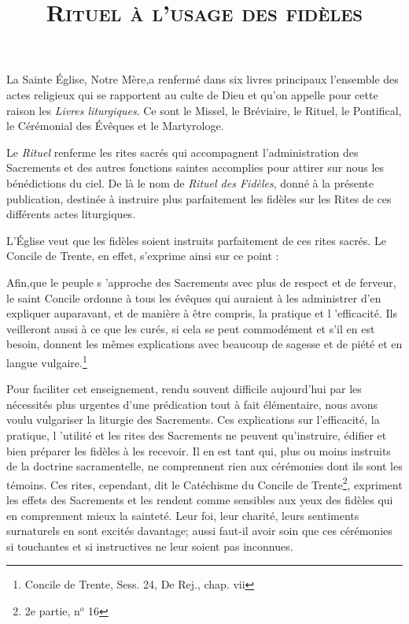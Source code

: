 \documentclass[12.5pt,latin,french,a6paper,twoside]{book}
\title{\textsc{\Huge{Rituel à l'usage des fidèles}}}
\date{}
\begin{document}
\maketitle
\newpage
\chap
{}
La Sainte Église, Notre Mère,a renfermé dans six livres principaux
l'ensemble des actes religieux qui se rapportent au
culte de Dieu et qu'on appelle pour cette raison les \emph{Livres
liturgiques}. Ce sont le Missel, le Bréviaire, le Rituel, le Pontifical,
le Cérémonial des Évêques et le Martyrologe.

Le \emph{Rituel} renferme les rites sacrés qui accompagnent l'administration
des Sacrements et des autres fonctions saintes accomplies
pour attirer sur nous les bénédictions du ciel. De là
le nom de \emph{Rituel des Fidèles}, donné à la présente publication,
destinée à instruire plus parfaitement les fidèles sur les Rites
de ces différents actes liturgiques.

L'Église veut que les fidèles soient instruits parfaitement
de ces rites sacrés. Le Concile de Trente, en effet, s'exprime
ainsi sur ce point  :

\og Afin,que le peuple s 'approche des Sacrements avec plus
de respect et de ferveur, le saint Concile ordonne à tous les
évêques qui auraient à les administrer d'en expliquer auparavant,
et de manière à être compris, la pratique et l 'efficacité.
Ils veilleront aussi à ce que les curés, si cela se peut commodément
et s'il en est besoin, donnent les mêmes explications avec
beaucoup de sagesse et de piété et en langue vulgaire.\fg \footnote{Concile de Trente, Sess. 24, De Rej., chap. vii}

Pour faciliter cet enseignement, rendu souvent difficile
aujourd'hui par les nécessités plus urgentes d'une prédication
tout à fait élémentaire, nous avons voulu vulgariser la liturgie
des Sacrements. Ces explications sur l'efficacité, la pratique,
l 'utilité et les rites des Sacrements ne peuvent qu'instruire,
édifier et bien préparer les fidèles à les recevoir. Il en est tant
qui, plus ou moins instruits de la doctrine sacramentelle, ne
comprennent rien aux cérémonies dont ils sont les témoins.
\og Ces rites, cependant, dit le Catéchisme du Concile de Trente\footnote{2e partie, n$^o$ 16}, expriment les effets des Sacrements et les
rendent comme sensibles aux yeux des fidèles qui en comprennent mieux la sainteté. Leur foi, leur charité, leurs sentiments
surnaturels en sont excités davantage; aussi faut-il
avoir soin que ces cérémonies si touchantes et si instructives
ne leur soient pas inconnues.\fg
\end{document}
